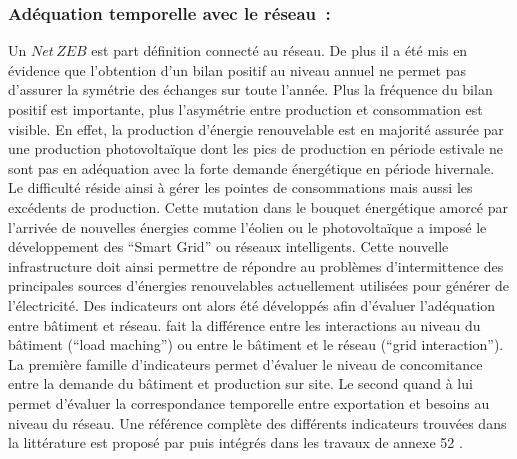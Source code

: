 \subsubsection{Adéquation temporelle avec le réseau~:} %
\label{ssub:adequation_temporelle_avec_le_réseau}
Un $Net\,ZEB$ est part définition connecté au réseau. De plus il a été mis en évidence
que l’obtention d’un bilan positif au niveau annuel ne permet pas d’assurer la
symétrie des échanges sur toute l’année. Plus la fréquence du bilan positif est importante,
plus l’asymétrie entre production et consommation est visible. En effet, la production
d’énergie renouvelable est en majorité assurée par une production photovoltaïque
dont les pics de production en période estivale ne sont pas en adéquation avec la forte demande
énergétique en période hivernale. Le difficulté réside ainsi à gérer les pointes
de consommations mais aussi les excédents de production.
Cette mutation dans le bouquet énergétique amorcé par l’arrivée de nouvelles énergies comme
l’éolien ou le photovoltaïque a imposé le développement des \enquote{Smart Grid}
ou réseaux intelligents. Cette nouvelle infrastructure doit ainsi permettre de répondre
au problèmes d’intermittence des principales sources d’énergies renouvelables actuellement
utilisées pour générer de l’électricité. Des indicateurs ont alors été développés
afin d’évaluer l’adéquation entre bâtiment et réseau.
\textcite{Voss2010} fait la différence entre les interactions au niveau du bâtiment
(\enquote{load maching}) ou entre le bâtiment et le réseau (\enquote{grid interaction}).
La première famille d’indicateurs permet d’évaluer le niveau de concomitance entre la
demande du bâtiment et production sur site. Le second quand à lui permet d’évaluer
la correspondance temporelle entre exportation et besoins au niveau du réseau.
Une référence complète des différents indicateurs trouvées dans la littérature est
proposé par \textcite{Salom2011} puis intégrés dans les travaux de annexe 52 \parencite{Salom2014}.


